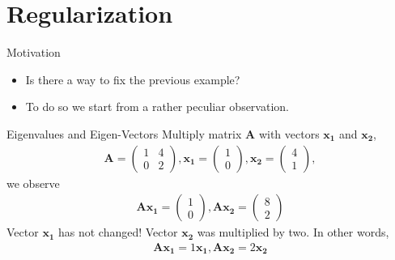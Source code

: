 \documentclass[notes]{beamer}
\begin{document}
  \section{Regularization}

  \begin{frame}{Motivation}
    \begin{itemize}
      \item Is there a way to fix the previous example?
      \item To do so we start from a rather peculiar observation.
    \end{itemize}
  \end{frame}

  \begin{frame}{Eigenvalues and Eigen-Vectors}
    Multiply matrix $\mathbf{A}$ with vectors $\mathbf{x_1}$ and $\mathbf{x_2}$,
    \begin{align}
      \mathbf{A} = \begin{pmatrix}
        1 & 4 \\
        0 & 2 
      \end{pmatrix},
      \mathbf{x_1} = \begin{pmatrix}
        1 \\ 0
      \end{pmatrix},
        \mathbf{x_2} = \begin{pmatrix}
          4 \\
          1
     \end{pmatrix},
    \end{align}
    we observe
    \begin{align}
      \mathbf{A}\mathbf{x_1} = \begin{pmatrix}
        1 \\ 0
      \end{pmatrix},
      \mathbf{A}\mathbf{x_2} = \begin{pmatrix}
        8 \\ 2
      \end{pmatrix}
    \end{align}
    Vector $\mathbf{x_1}$ has not changed! Vector $\mathbf{x_2}$ was multiplied by two.
    In other words,
    \begin{align}
      \mathbf{A}\mathbf{x_1} = 1 \mathbf{x_1}, \mathbf{A}\mathbf{x_2} = 2 \mathbf{x_2} 
    \end{align}
  \end{frame}
\end{document}
